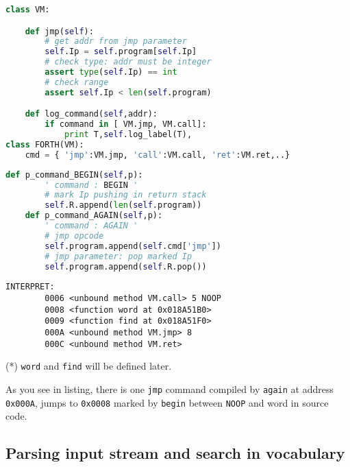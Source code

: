 \begin{lstlisting}[language=Python]
class VM:

	def jmp(self):
		# get addr from jmp parameter
		self.Ip = self.program[self.Ip]
		# check type: addr must be integer
		assert type(self.Ip) == int
		# check range
		assert self.Ip < len(self.program)	

	def log_command(self,addr):
		if command in [ VM.jmp, VM.call]:
			print T,self.log_label(T),
class FORTH(VM):
	cmd = { 'jmp':VM.jmp, 'call':VM.call, 'ret':VM.ret,..}
\end{lstlisting}

\begin{lstlisting}[language=Python]
 	def p_command_BEGIN(self,p):
		' command : BEGIN '
		# mark Ip pushing in return stack
		self.R.append(len(self.program))
 	def p_command_AGAIN(self,p):
		' command : AGAIN '
		# jmp opcode
		self.program.append(self.cmd['jmp'])
		# jmp parameter: pop marked Ip
		self.program.append(self.R.pop())
\end{lstlisting}

\begin{lstlisting}
INTERPRET:
        0006 <unbound method VM.call> 5 NOOP
        0008 <function word at 0x018A51B0>
        0009 <function find at 0x018A51F0>
        000A <unbound method VM.jmp> 8
        000C <unbound method VM.ret>
\end{lstlisting}

\noindent
(*) \verb|word| and \verb|find| will be defined later.
\bigskip

As you see in listing, there is one \verb|jmp| command compiled by \verb|again|
at address \verb|0x000A|, jumps to \verb|0x0008| marked by \verb|begin| between
\verb|NOOP| and word in source code.

\clearpage
\subsection{Parsing input stream and search in vocabulary}

